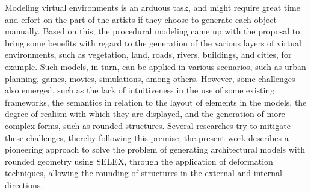 Modeling virtual environments is an arduous task, and might require great time and effort on the part of the artists if they choose to generate each object manually. Based on this, the procedural modeling came up with the proposal to bring some benefits with regard to the generation of the various layers of virtual environments, such as vegetation, land, roads, rivers, buildings, and cities, for example. Such models, in turn, can be applied in various scenarios, such as urban planning, games, movies, simulations, among others. However, some challenges also emerged, such as the lack of intuitiveness in the use of some existing frameworks, the semantics in relation to the layout of elements in the models, the degree of realism with which they are displayed, and the generation of more complex forms, such as rounded structures. Several researches try to mitigate these challenges, thereby following this premise, the present work describes a pioneering approach to solve the problem of generating architectural models with rounded geometry using \gls{SELEX}, through the application of deformation techniques, allowing the rounding of structures in the external and internal directions.

